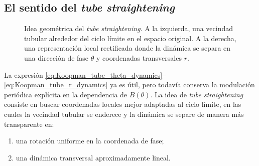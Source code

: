 \subsection{El sentido del \emph{tube straightening}}
\begin{figure}[t]
\centering
{}
\caption{Idea geom\'etrica del \emph{tube straightening}. A la izquierda, una vecindad tubular alrededor del ciclo l\'imite en el espacio original. A la derecha, una representaci\'on local rectificada donde la din\'amica se separa en una direcci\'on de fase \(\theta\) y coordenadas transversales \(r\).}
\label{fig:koopman_tube_straightening}
\end{figure}
La expresión \eqref{eq:Koopman_tube_theta_dynamics}--\eqref{eq:Koopman_tube_r_dynamics} ya es útil, pero todavía conserva la modulación periódica explícita en la dependencia de \(B(\theta)\). La idea de \emph{tube straightening} consiste en buscar coordenadas locales mejor adaptadas al ciclo límite, en las cuales la vecindad tubular se enderece y la dinámica se separe de manera más transparente en:
\begin{enumerate}
\item una rotación uniforme en la coordenada de fase;
\item una dinámica transversal aproximadamente lineal.
\end{enumerate}

